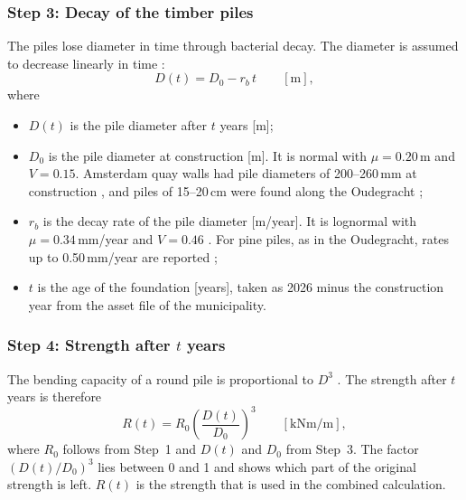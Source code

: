 \subsubsection*{Step 3: Decay of the timber piles}
The piles lose diameter in time through bacterial decay. The diameter is
assumed to decrease linearly in time \parencite{sharma2023, klaassen2009}:
\begin{equation}
  D(t) = D_0 - r_b\,t \qquad [\mathrm{m}], \label{eq:pile_diameter}
\end{equation}
where
\begin{itemize}
  \item $D(t)$ is the pile diameter after $t$ years [m];
  \item $D_0$ is the pile diameter at construction [m]. It is normal with
        $\mu = 0.20$\,m and $V = 0.15$. Amsterdam quay walls had pile
        diameters of 200--260\,mm at construction \parencite{sharma2023}, and
        piles of 15--20\,cm were found along the Oudegracht
        \parencite{erfgoed156};
  \item $r_b$ is the decay rate of the pile diameter [m/year]. It is
        lognormal with $\mu = 0.34$\,mm/year and $V = 0.46$
        \parencite{hemel2024}. For pine piles, as in the Oudegracht, rates
        up to 0.50\,mm/year are reported \parencite{klaassen2009};
  \item $t$ is the age of the foundation [years], taken as 2026 minus the
        construction year from the asset file of the municipality.
\end{itemize}

\subsubsection*{Step 4: Strength after $t$ years}
The bending capacity of a round pile is proportional to $D^3$
\parencite{verruijt2018}. The strength after $t$ years is therefore
\begin{equation}
  R(t) = R_0 \left(\frac{D(t)}{D_0}\right)^{3}
         \qquad [\mathrm{kNm/m}], \label{eq:strength_t}
\end{equation}
where $R_0$ follows from Step~1 and $D(t)$ and $D_0$ from Step~3. The factor
$(D(t)/D_0)^3$ lies between 0 and 1 and shows which part of the original
strength is left. $R(t)$ is the strength that is used in the combined
calculation.

